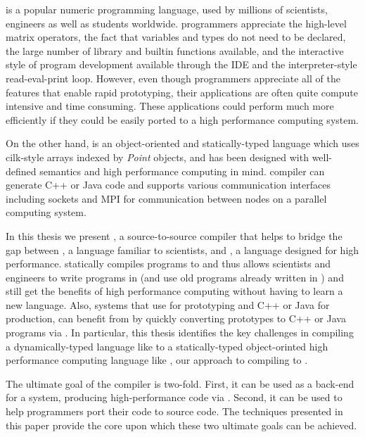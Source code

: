 \matlab is a popular numeric programming language, used by millions of
scientists, engineers as well as students worldwide\cite{MatlabGrowth}.  \matlab
programmers appreciate the high-level matrix operators,  the fact that
variables and types do not need to be declared, the large number of library and
builtin functions available, and the interactive style of program development
available through the IDE and the interpreter-style read-eval-print loop.
However, even though \matlab programmers appreciate all of the features that
enable rapid prototyping,  their applications are often quite compute intensive
and time consuming. These applications could perform much more efficiently if
they could be easily ported to a high performance computing system.  

On the other hand, \xten is an object-oriented and statically-typed language
which uses cilk-style arrays indexed by \emph{Point} objects, and has been
designed with well-defined semantics and high performance computing in mind.
\xten compiler can generate C++ or Java code and supports various communication
interfaces including sockets and MPI for communication between nodes on a
parallel computing system.

In this thesis we present \mixten, a source-to-source compiler that helps
to bridge the gap between \matlab, a language familiar to scientists,
and \xten,  a language designed for high performance. \mixten statically
compiles \matlab programs to \xten and thus
allows scientists and engineers to write programs in \matlab (and use old 
programs already written in \matlab) and still get the benefits of high 
performance computing without having to learn a new language. Also, systems that
use \matlab for prototyping and C++ or Java for production, can benefit from
\mixten by quickly converting \matlab prototypes to C++ or Java programs via 
\xten. In particular, this thesis identifies the key challenges in compiling a
dynamically-typed language like \matlab to a statically-typed object-orinted
high performance computing language like \xten, our approach to 
compiling \matlab to \xten.

The ultimate goal of the \mixten compiler is two-fold.  First, it can be used
as a back-end for a \matlab system,  producing high-performance code via \xten.
Second, it can be used to help programmers port their \matlab code to \xten
source code.   The techniques presented in this paper provide the core upon
which these two ultimate goals can be achieved.

\begin{comment}
\mixten is built on top of the \mclab front-end and analysis toolkits.  
- Introduce \matlab briefly, why is it difficult but important to have a
  static compiler for it and why do we choose \xten as our target.- concentrate
more on high -level issues like lack of documentation, scientists are not
programmers,performance issues, popularity, need for static compilation to
other high-level languages. We talk about \matlab semantics and wild features
in the next section\smallskip
- Briefly introduce the high-level design of \mixten.\smallskip 
\end{comment}
  
